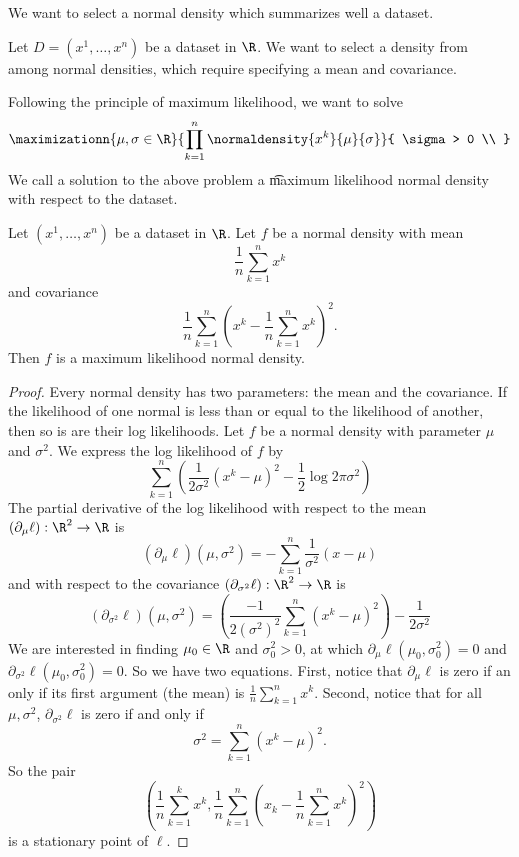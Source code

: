 

We want to select a normal density which summarizes well a dataset.


Let $D = (x^1, \dots, x^n)$ be a dataset in $\R$.
We want to select a density from among normal densities, which require specifying a mean and covariance.

Following the principle of maximum likelihood, we want to solve
\[
  \maximizationn{\mu,\sigma \in \R}{
    \prod_{k = 1}^{n}  \normaldensity{x^k}{\mu}{\sigma}
  }{
    \sigma > 0 \\
  }
\]
We call a solution to the above problem a \t{maximum likelihood normal density} with respect to the dataset.


\begin{prop}

Let $(x^1, \dots, x^n)$ be a dataset in $\R$.
Let $f$ be a normal density with mean
$$\frac{1}{n} \sum_{k = 1}^{n} x^k$$
and covariance
$$\frac{1}{n} \sum_{k = 1}^{n} \left(x^k - \frac{1}{n} \sum_{k = 1}^{n} x^k\right)^2.$$
Then $f$ is a maximum likelihood normal density.
\begin{proof}
  Every normal density has two parameters: the mean
  and the covariance.
  If the likelihood of one normal is less than or equal
  to the likelihood of another, then so is are their
  log likelihoods.
  Let $f$ be a normal density with parameter $\mu$ and $\sigma^2$.
  We express the log likelihood of
  $f$ by
  \[
    \sum_{k = 1}^{n} \left( \frac{1}{2\sigma^2}(x^k - \mu)^2 - \frac{1}{2}\log2\pi\sigma^2\right)
  \]
  The partial derivative of the log likelihood with
  respect to the mean $(\partial_{\mu} \ell): \R^2 \to \R$ is
  \[
    (\partial_\mu \ell)(\mu, \sigma^2) = - \sum_{k = 1}^{n} \frac{1}{\sigma^2}(x - \mu)
  \]
  and with respect to the covariance $(\partial_{\sigma^2} \ell): \R^2 \to \R$ is
  \[
    (\partial_{\sigma^2} \ell)(\mu, \sigma^2) =
    \left(\frac{-1}{2(\sigma^2)^{2}}\sum_{k = 1}^{n}(x^k - \mu)^2\right)- \frac{1}{2\sigma^2}
  \]
  We are interested in finding $\mu_0 \in \R$ and $\sigma^2_0 > 0$, at which
  $\partial_\mu \ell(\mu_0, \sigma^2_0) = 0$ and
  $\partial_{\sigma^2} \ell(\mu_0, \sigma^2_0) = 0$.
  So we have two equations.
  First, notice that
  $\partial_\mu \ell$ is zero if an only if
  its first argument (the mean) is $\frac{1}{n} \sum_{k = 1}^{n} x^k$.
  Second, notice that for all $\mu, \sigma^2$,
  $\partial_{\sigma^2}\ell$ is zero if and only if
  \[
    \sigma^2 = \sum_{k = 1}^{n} (x^k - \mu)^2.
  \]
  So the pair
  \[
    \left(\frac{1}{n}\sum_{k = 1}^{k} x^k, \frac{1}{n} \sum_{k = 1}^{n} (x_k - \frac{1}{n} \sum_{k = 1}^{n}  x^k)^2\right)
  \]
  is a stationary point of $\ell$.
\end{proof}
\end{prop}
